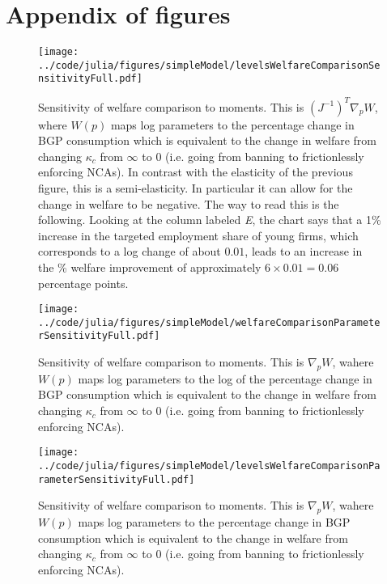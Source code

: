 \documentclass[11pt,english]{article}
\theoremstyle{remark}
\begin{document}
\newpage
\section{Appendix of figures}

\begin{figure}[!htb]
	\texttt{[image: ../code/julia/figures/simpleModel/levelsWelfareComparisonSensitivityFull.pdf]}
	\caption{Sensitivity of welfare comparison to moments. This is $(J^{-1})^T \nabla_p W$, where $W(p)$ maps log parameters to the percentage change in BGP consumption which is equivalent to the change in welfare from changing $\kappa_c$ from $\infty$ to $0$ (i.e. going from banning to frictionlessly enforcing NCAs). In contrast with the elasticity of the previous figure, this is a semi-elasticity. In particular it can allow for the change in welfare to be negative. The way to read this is the following. Looking at the column labeled \textit{E}, the chart says that a 1\% increase in the targeted employment share of young firms, which corresponds to a log change of about $0.01$, leads to an increase in the \% welfare improvement of approximately $6 \times 0.01 = 0.06$ percentage points.}
	\label{levelsWelfareComparisonSensitivityFull}
\end{figure}

\begin{figure}[]
	\texttt{[image: ../code/julia/figures/simpleModel/welfareComparisonParameterSensitivityFull.pdf]}
	\caption{Sensitivity of welfare comparison to moments. This is $\nabla_p W$, wahere $W(p)$ maps log parameters to the log of the percentage change in BGP consumption which is equivalent to the change in welfare from changing $\kappa_c$ from $\infty$ to $0$ (i.e. going from banning to frictionlessly enforcing NCAs).}
	\label{welfareComparisonParameterSensitivityFull}
\end{figure}

\begin{figure}[]
	\texttt{[image: ../code/julia/figures/simpleModel/levelsWelfareComparisonParameterSensitivityFull.pdf]}
	\caption{Sensitivity of welfare comparison to moments. This is $\nabla_p W$, wahere $W(p)$ maps log parameters to the percentage change in BGP consumption which is equivalent to the change in welfare from changing $\kappa_c$ from $\infty$ to $0$ (i.e. going from banning to frictionlessly enforcing NCAs).}
	\label{levelsWelfareComparisonParameterSensitivityFull}
\end{figure}
\end{document}
